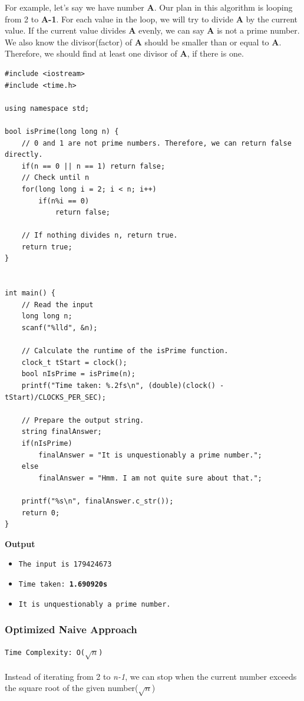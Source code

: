 \documentclass[12pt]{article}
\begin{document}
For example, let's say we have number \textbf{A}. Our plan in this algorithm is looping from 2 to \textbf{A-1}. For each value in the loop, we will try to divide \textbf{A} by the current value. If the current value divides \textbf{A} evenly, we can say \textbf{A} is not a prime number.  We also know the divisor(factor) of \textbf{A} should be smaller than or equal to \textbf{A}.  Therefore,  we should find at least one divisor of \textbf{A}, if there is one.

\begin{verbatim}
#include <iostream>
#include <time.h>

using namespace std;

bool isPrime(long long n) {
    // 0 and 1 are not prime numbers. Therefore, we can return false directly.
    if(n == 0 || n == 1) return false;
    // Check until n
    for(long long i = 2; i < n; i++)
        if(n%i == 0)
            return false;
    
    // If nothing divides n, return true.
    return true;
}


int main() {
    // Read the input
    long long n;
    scanf("%lld", &n);
    
    // Calculate the runtime of the isPrime function.
    clock_t tStart = clock();
    bool nIsPrime = isPrime(n);
    printf("Time taken: %.2fs\n", (double)(clock() - tStart)/CLOCKS_PER_SEC);
    
    // Prepare the output string.
    string finalAnswer;
    if(nIsPrime)
        finalAnswer = "It is unquestionably a prime number.";
    else
        finalAnswer = "Hmm. I am not quite sure about that.";
    
    printf("%s\n", finalAnswer.c_str());
    return 0;
}
\end{verbatim}
\clearpage
\textbf{Output}
\begin{itemize}
  \item \texttt{The input is 179424673} 
  \item \texttt{Time taken: \textbf{1.690920s}} 
  \item \texttt{It is unquestionably a prime number.} 
\end{itemize}

\subsubsection{Optimized Naive Approach}
\texttt{Time Complexity: O($\sqrt{n}$)} \\ \\
Instead of iterating from 2 to \textit{n-1}, we can stop when the current number exceeds the square root of the given number($\sqrt{n}$) 
\end{document}
